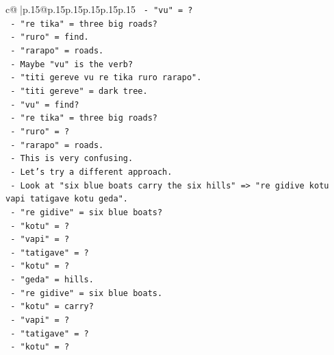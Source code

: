 \documentclass{article}
\begin{document}
{\begin{supertabular}{c@{$\;$}|p{.15\linewidth}@{}p{.15\linewidth}p{.15\linewidth}p{.15\linewidth}p{.15\linewidth}p{.15\linewidth}}
{{{\texttt{                         {-} "vu" = ?} \\
\texttt{                         {-} "re tika" = three big roads?} \\
\texttt{                         {-} "ruro" = find.} \\
\texttt{                         {-} "rarapo" = roads.} \\
\texttt{                         {-} Maybe "vu" is the verb?} \\
\texttt{                         {-} "titi gereve vu re tika ruro rarapo".} \\
\texttt{                         {-} "titi gereve" = dark tree.} \\
\texttt{                         {-} "vu" = find?} \\
\texttt{                         {-} "re tika" = three big roads?} \\
\texttt{                         {-} "ruro" = ?} \\
\texttt{                         {-} "rarapo" = roads.} \\
\texttt{                         {-} This is very confusing.} \\
\texttt{                         {-} Let's try a different approach.} \\
\texttt{                         {-} Look at "six blue boats carry the six hills" => "re gidive kotu vapi tatigave kotu geda".} \\
\texttt{                           {-} "re gidive" = six blue boats?} \\
\texttt{                           {-} "kotu" = ?} \\
\texttt{                           {-} "vapi" = ?} \\
\texttt{                           {-} "tatigave" = ?} \\
\texttt{                           {-} "kotu" = ?} \\
\texttt{                           {-} "geda" = hills.} \\
\texttt{                           {-} "re gidive" = six blue boats.} \\
\texttt{                           {-} "kotu" = carry?} \\
\texttt{                           {-} "vapi" = ?} \\
\texttt{                           {-} "tatigave" = ?} \\
\texttt{                           {-} "kotu" = ?} \\
}}}
\end{supertabular}}
\end{document}

